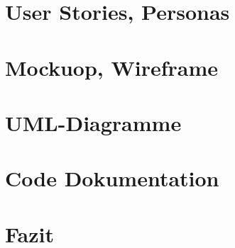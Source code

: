 \documentclass[a4paper]{article}
\begin{document}
\section{User Stories, Personas}

\section{Mockuop, Wireframe}

\section{UML-Diagramme}

\section{Code Dokumentation}

\section{Fazit}
\end{document}
